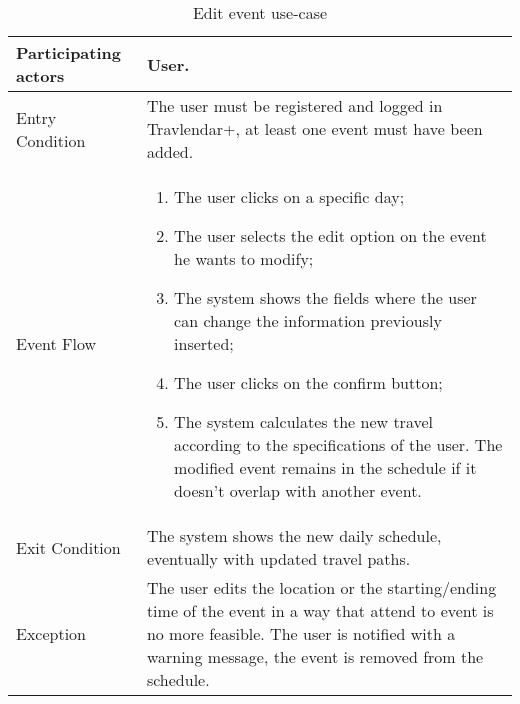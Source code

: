 \begin{table}[H]
	\begin{center}
		\begin{tabular}{ | p{} | p{} | }
		\hline
		Participating actors &  User.\\
		\hline
		Entry Condition & The user must be registered and logged in Travlendar+, at least one event must have been added.\\
		\hline
		Event Flow & 
			\begin{enumerate}
				\item The user clicks on a specific day;
				\item The user selects the edit option on the event he wants to modify;
				\item The system shows the fields where the user can change the information previously inserted;
				\item The user clicks on the confirm button;
				\item The system calculates the new travel according to the specifications of the user. The modified event remains in the schedule if it doesn’t overlap with another event.
			\end{enumerate} \\
		\hline
		Exit Condition & The system shows the new daily schedule, eventually with updated travel paths. \\
		\hline
		Exception & The user edits the location or the starting/ending time of the event in a way that attend to event is no more feasible. The user is notified with a warning message, the event is removed from the schedule.\\ 
		\hline
		\end{tabular}
	\end{center}
	\caption{Edit event use-case}
\end{table}
